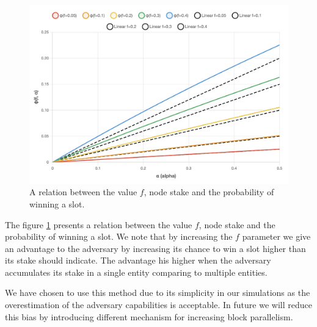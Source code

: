 \begin{figure}
\includegraphics[width=\textwidth]{figs/f-parallelism-bias.png}
\caption{A relation between the value $f$, node stake and the probability of winning a slot.}
\label{fig:f-parallelism-bias}
\end{figure}

The figure \ref{fig:f-parallelism-bias} presents a relation between the value $f$, node stake and the probability of winning a slot. We note that by increasing the $f$ parameter we give an advantage to the adversary by increasing its chance to win a slot higher than its stake should indicate. The advantage his higher when the adversary accumulates its stake in a single entity comparing to multiple entities.

We have chosen to use this method due to its simplicity in our simulations as the overestimation of the adversary capabilities is acceptable. In future we will reduce this bias by introducing different mechanism for increasing block parallelism.

